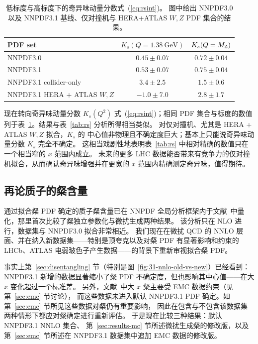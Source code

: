 \begin{table}[t]
  \begin{center}
        \renewcommand{\arraystretch}{1.2}
\begin{tabular}{|l|c|c|}
\hline
\centering PDF set &  $K_s(Q=1.38~\mathrm{GeV})$ & $K_s(Q=M_{\rm Z})$ \\
\hline
\hline
NNPDF3.0   &  $0.45 \pm 0.07$  & $0.72 \pm 0.04$ \\
NNPDF3.1    & $0.53 \pm 0.07$  &  $ 0.75 \pm 0.04 $  \\
NNPDF3.1 collider-only   & $3.4 \pm 2.5$  & $1.5 \pm 0.6$  \\
NNPDF3.1 HERA + ATLAS $W,Z$   & $-1.0 \pm 7.0$  & $2.8 \pm 1.7$ \\
\hline
\end{tabular}
\end{center}
\caption{\small \label{tab:rsint} 
  低标度与高标度下的奇异味动量分数式~(\ref{eq:rsint})。
  图中给出 NNPDF3.0 以及 NNPDF3.1 基线、仅对撞机与 HERA+ATLAS $W,Z$ PDF 集合的结果。}
\end{table}


现在转向奇异味动量分数 $K_s(Q^2)$ 式~(\ref{eq:rsint})；相同 PDF 集合与标度的数值列于表~\ref{tab:rsint}。结果与表~\ref{tab:rs} 分析所得相当类似。
对仅对撞机、尤其是 HERA + ATLAS $W,Z$ 拟合，$K_s$ 的
中心值非物理且不确定度巨大；基本上只能说奇异味动量分数 $K_s$ 完全不确定。
这相当戏剧性地表明表~\ref{tab:rs} 中相对精确的数值只在一个相当窄的 $x$ 范围内成立。
未来的更多 LHC 数据能否带来有竞争力的仅对撞机拟合，从而确认奇异味增强并在更宽的 $x$ 范围内精确测定奇异味，值得期待。

\subsection{再论质子的粲含量}
\label{sec:phenocharm}

通过拟合粲 PDF 确定的质子粲含量已在 NNPDF 全局分析框架内于文献~\cite{Ball:2016neh}中量化，那里首次比较了粲独立参数化与微扰生成两种结果。
%
该分析只在 NLO 进行，数据集与 NNPDF3.0 拟合非常相近。
%
我们现在在微扰 QCD 的 NNLO 层面、并在纳入新数据集——特别是顶夸克以及对粲 PDF 有显著影响和约束的 LHCb、ATLAS 电弱玻色子产生数据——的背景下重新审视拟合粲 PDF。

事实上第~\ref{sec:disentangling} 节（特别是图~\ref{fig:31-nnlo-old-vs-new}）已经看到：
NNPDF3.1 新增的数据显著缩小了粲 PDF 不确定度，但也影响其中心值——在大 $x$ 变化超过一个标准差。
另外，文献~\cite{Ball:2016neh}中大 $x$ 粲主要受 EMC 数据约束（见第~\ref{sec:emc} 节讨论），
而这些数据未进入默认 NNPDF3.1 PDF 确定。如第~\ref{sec:emc} 节所见这些数据对粲仍有重要影响，
因此在包含与不包含该数据集两种情形下都应对粲确定进行重新评估。
于是现在比较三种结果：默认 NNPDF3.1 NNLO 集合、
第~\ref{sec:results-mc} 节所述微扰生成粲的修改版，以及第~\ref{sec:emc} 节所述在 NNPDF3.1
数据集中追加 EMC 数据的修改版。

